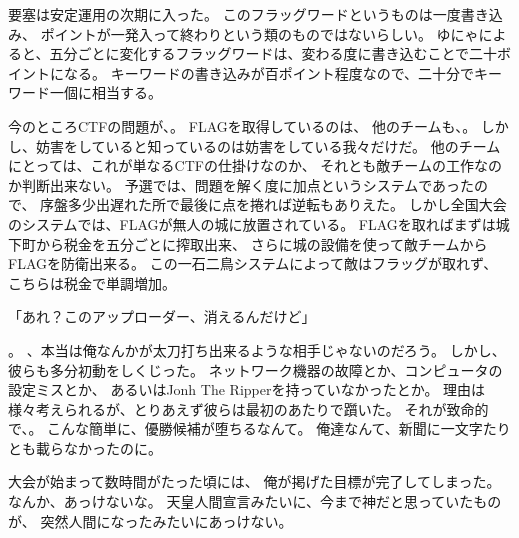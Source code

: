 要塞は安定運用の次期に入った。
このフラッグワードというものは一度書き込み、
ポイントが一発入って終わりという類のものではないらしい。
ゆにゃによると、五分ごとに変化するフラッグワードは、変わる度に書き込むことで二十ボイントになる。
キーワードの書き込みが百ポイント程度なので、二十分でキーワード一個に相当する。

今のところCTFの問題が、。
FLAGを取得しているのは、
他のチームも、。
しかし、妨害をしていると知っているのは妨害をしている我々だけだ。
他のチームにとっては、これが単なるCTFの仕掛けなのか、
それとも敵チームの工作なのか判断出来ない。
予選では、問題を解く度に加点というシステムであったので、
序盤多少出遅れた所で最後に点を捲れば逆転もありえた。
しかし全国大会のシステムでは、FLAGが無人の城に放置されている。
FLAGを取ればまずは城下町から税金を五分ごとに搾取出来、
さらに城の設備を使って敵チームからFLAGを防衛出来る。
この一石二鳥システムによって敵はフラッグが取れず、
こちらは税金で単調増加。

「あれ？このアップローダー、消えるんだけど」

。
、本当は俺なんかが太刀打ち出来るような相手じゃないのだろう。
しかし、彼らも多分初動をしくじった。
ネットワーク機器の故障とか、コンピュータの設定ミスとか、
あるいはJonh The Ripperを持っていなかったとか。
理由は様々考えられるが、とりあえず彼らは最初のあたりで躓いた。
それが致命的で、。
こんな簡単に、優勝候補が堕ちるなんて。
俺達なんて、新聞に一文字たりとも載らなかったのに。

大会が始まって数時間がたった頃には、
俺が掲げた目標が完了してしまった。
なんか、あっけないな。
天皇人間宣言みたいに、今まで神だと思っていたものが、
突然人間になったみたいにあっけない。

